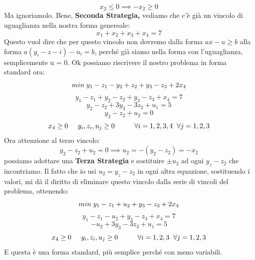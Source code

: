 \begin{equation*}
    x_2 \leq 0 \implies - x_2 \geq 0
\end{equation*}
Ma ignoriamolo. Bene, \textbf{Seconda Strategia,} vediamo che c'è già un vincolo di uguaglianza nella nostra forma genereale:
\begin{equation*}
    x_1 + x_2 + x_3 + x_4 = 7
\end{equation*}
Questo vuol dire che per questo vincolo non dovremo dalla forma $ax - u \geq b$ alla forma $a(y_i-z-i)-u_i = b$, perché già siamo nella forma con l'uguaglianza, semplicemente u = 0. Ok possiamo riscrivere il nostro problema in forma standard ora:
\begin{equation*}
    min \hspace{0.1cm} y_1 - z_1 - y_2 + z_2 + y_3 - z_3 + 2x_4  
\end{equation*}
\begin{equation*}
    y_1 - z_1 + y_2 - z_2 + y_3 - z_3 + x_4 = 7
\end{equation*}
\begin{equation*}
    y_2 - z_2 + 3y_3 - 3z_3 + u_1 = 5
\end{equation*}
\begin{equation*}
    y_2 - z_2 + u_2 = 0
\end{equation*}
\begin{equation*}
    x_4 \geq 0 \hspace{0.5cm} y_i, z_i, u_j \geq 0 \hspace{1cm} \forall i = 1,2,3,4 \hspace{0.2cm} \forall j = 1,2,3
\end{equation*}
Ora attenzione al terzo vincolo: 
\begin{equation*}
    y_2 - z_2 + u_2 = 0 \implies u_2 = -(y_2 - z_2) = -x_2
\end{equation*}
possiamo adottare una \textbf{Terza Strategia} e sostituire $\pm u_2$ ad ogni $y_z - z_2$ che incontriamo. Il fatto che io usi $u_2 = y_z - z_2$ in ogni altra equazione, sostituendo i valori, mi dà il diritto di eliminare questo vincolo dalla serie di vincoli del problema, ottenendo:
\begin{equation*}
    min \hspace{0.1cm} y_1 - z_1 + u_2 + y_3 - z_3 + 2x_4  
\end{equation*}
\begin{equation*}
    y_1 - z_1 - u_2 + y_3 - z_3 + x_4 = 7
\end{equation*}
\begin{equation*}
    - u_2 + 3y_3 - 3z_3 + u_1 = 5
\end{equation*}
\begin{equation*}
    x_4 \geq 0  \hspace{0.5cm} y_i, z_i, u_j \geq 0 \hspace{1cm} \forall i = 1,2,3 \hspace{0.2cm} \forall j = 1,2,3
\end{equation*}
E questa è una forma standard, più semplice perché con meno variabili.


